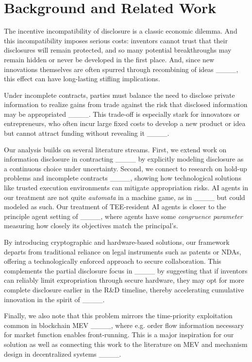 \section{Background and Related Work}
The incentive incompatibility of disclosure is a classic economic dilemma. And this incompatibility imposes serious costs: inventors cannot trust that their disclosures will remain protected, and so many potential breakthroughs may remain hidden or never be developed in the first place. And, since new innovations themselves are often spurred through recombining of ideas ____, this effect can have long-lasting stifling implications.

Under incomplete contracts, parties must balance the need to disclose private information to realize gains from trade against the risk that disclosed information may be appropriated ____. This trade-off is especially stark for innovators or entrepreneurs, who often incur large fixed costs to develop a new product or idea but cannot attract funding without revealing it ____. 

Our analysis builds on several literature streams. First, we extend work on information disclosure in contracting ____ by explicitly modeling disclosure as a continuous choice under uncertainty. Second, we connect to research on hold-up problems and incomplete contracts ____, showing how technological solutions like trusted execution environments can mitigate appropriation risks.  AI agents in our treatment are not quite \emph{automata} in a machine game, as in ____ but could modeled as such. Our treatment of TEE-resident AI agents is closer to the principle agent setting of ____, where agents have some \emph{congruence parameter} measuring how closely its objectives match the principal’s.

By introducing cryptographic and hardware-based solutions, our framework departs from traditional reliance on legal instruments such as patents or NDAs, offering a technologically enforced approach to secure collaboration. This complements the partial disclosure focus in ____ by suggesting that if inventors can reliably limit expropriation through secure hardware, they may opt for more complete disclosure earlier in the R\&D timeline, thereby accelerating cumulative innovation in the spirit of ____.

Finally, we also note that this problem mirrors the time-priority exploitation common in blockchain MEV ____, where e.g. order flow information necessary for market function enables front-running. This is a major inspiration for our solution as well as connecting this work to the literature on MEV and mechanism design in decentralized systems ____.

